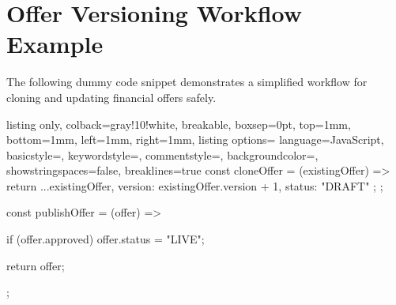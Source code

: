 \section{Offer Versioning Workflow Example}

The following dummy code snippet demonstrates a simplified workflow for cloning and updating financial offers safely.

\begin{tcblisting}{listing only,
    colback=gray!10!white, 
    breakable, 
    boxsep=0pt,
    top=1mm,
    bottom=1mm,
    left=1mm,
    right=1mm,
    listing options={
        language=JavaScript,
        basicstyle=\small\ttfamily,
        keywordstyle=\color{blue},
        commentstyle=\color{gray},
        backgroundcolor=\color{gray!25},
        showstringspaces=false,
        breaklines=true
    }
}
const cloneOffer = (existingOffer) => {
    return {
        ...existingOffer,
        version: existingOffer.version + 1,
        status: "DRAFT"
    };
};

const publishOffer = (offer) => {
    if (offer.approved) {
        offer.status = "LIVE";
    }

    return offer;
};
\end{tcblisting}
